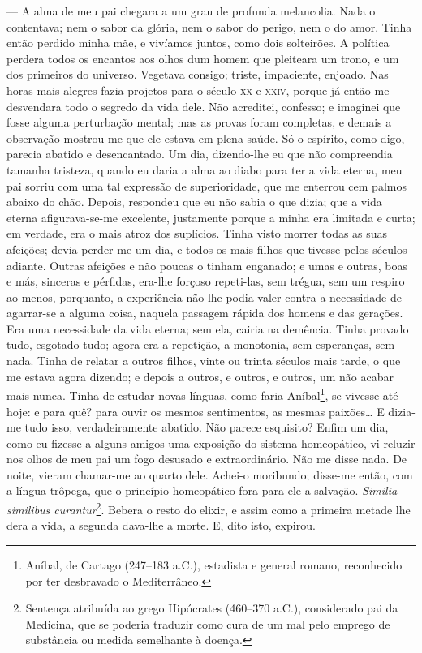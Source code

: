 --- A alma de meu pai chegara a um grau de profunda melancolia. Nada o
contentava; nem o sabor da glória, nem o sabor do perigo, nem o do amor.
Tinha então perdido minha mãe, e vivíamos juntos, como dois solteirões.
A política perdera todos os encantos aos olhos dum homem que pleiteara
um trono, e um dos primeiros do universo. Vegetava consigo; triste,
impaciente, enjoado. Nas horas mais alegres fazia projetos para o século
\textsc{xx} e \textsc{xxiv}, porque já então me desvendara todo o segredo da vida dele.
Não acreditei, confesso; e imaginei que fosse alguma perturbação mental;
mas as provas foram completas, e demais a observação mostrou-me que ele
estava em plena saúde. Só o espírito, como digo, parecia abatido e
desencantado. Um dia, dizendo-lhe eu que não compreendia tamanha
tristeza, quando eu daria a alma ao diabo para ter a vida eterna, meu
pai sorriu com uma tal expressão de superioridade, que me enterrou cem
palmos abaixo do chão. Depois, respondeu que eu não sabia o que dizia;
que a vida eterna afigurava-se-me excelente, justamente porque a minha
era limitada e curta; em verdade, era o mais atroz dos suplícios. Tinha
visto morrer todas as suas afeições; devia perder-me um dia, e todos os
mais filhos que tivesse pelos séculos adiante. Outras afeições e não
poucas o tinham enganado; e umas e outras, boas e más, sinceras e
pérfidas, era-lhe forçoso repeti-las, sem trégua, sem um respiro ao
menos, porquanto, a experiência não lhe podia valer contra a necessidade
de agarrar-se a alguma coisa, naquela passagem rápida dos homens e das
gerações. Era uma necessidade da vida eterna; sem ela, cairia na
demência. Tinha provado tudo, esgotado tudo; agora era a repetição, a
monotonia, sem esperanças, sem nada. Tinha de relatar a outros filhos,
vinte ou trinta séculos mais tarde, o que me estava agora dizendo; e
depois a outros, e outros, e outros, um não acabar mais nunca. Tinha de
estudar novas línguas, como faria Aníbal\footnote{Aníbal, de Cartago
  (247--183 a.C.), estadista e general romano, reconhecido por ter
  desbravado o Mediterrâneo.}, se vivesse até hoje: e para quê? para
ouvir os mesmos sentimentos, as mesmas paixões\ldots{} E dizia-me tudo isso,
verdadeiramente abatido. Não parece esquisito? Enfim um dia, como eu
fizesse a alguns amigos uma exposição do sistema homeopático, vi reluzir
nos olhos de meu pai um fogo desusado e extraordinário. Não me disse
nada. De noite, vieram chamar-me ao quarto dele. Achei-o moribundo;
disse-me então, com a língua trôpega, que o princípio homeopático fora
para ele a salvação. \emph{Similia similibus curantur}\footnote{Sentença
  atribuída ao grego Hipócrates (460--370 a.C.), considerado pai da
  Medicina, que se poderia traduzir como cura de um mal pelo emprego de
  substância ou medida semelhante à doença.}. Bebera o resto do elixir,
e assim como a primeira metade lhe dera a vida, a segunda dava-lhe a
morte. E, dito isto, expirou.


